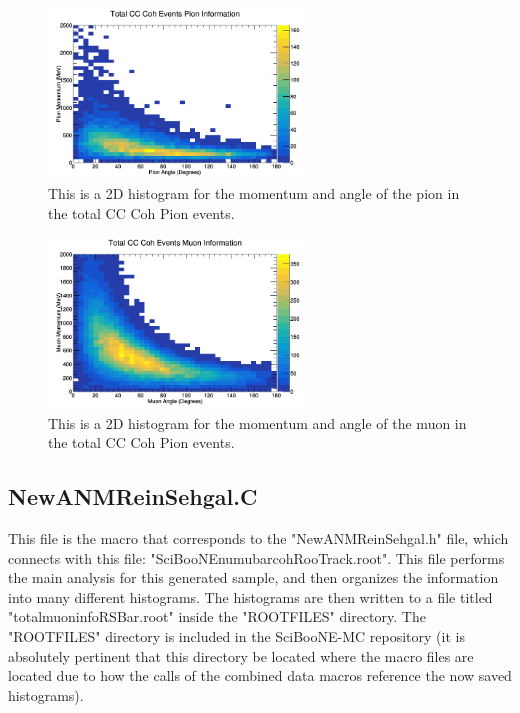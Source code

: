 \documentclass[11pt]{article}
\begin{document}
\begin{figure}[H]
\centering
\includegraphics[width=0.6\textwidth]{OldNMReinSehgalImages/8-TotalCCCohPionInfoNMORS.png}
\caption{This is a 2D histogram for the momentum and angle of the pion in the total CC Coh Pion events.}
\end{figure}

\begin{figure}[H]
\centering
\includegraphics[width=0.6\textwidth]{OldNMReinSehgalImages/9-TotalCCCohMuonInfoNMORS.png}
\caption{This is a 2D histogram for the momentum and angle of the muon in the total CC Coh Pion events.}
\end{figure}


\subsection{NewANMReinSehgal.C}
This file is the macro that corresponds to the "NewANMReinSehgal.h" file, which connects with this file: "SciBooNE\textunderscore numubar\textunderscore coh\textunderscore RooTrack.root". This file performs the main analysis for this generated sample, and then organizes the information into many different histograms. The histograms are then written to a file titled "totalmuoninfoRSBar.root" inside the "ROOTFILES" directory. The "ROOTFILES" directory is included in the SciBooNE-MC repository (it is absolutely pertinent that this directory be located where the macro files are located due to how the calls of the combined data macros reference the now saved histograms).
\end{document}
